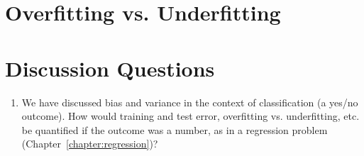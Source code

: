 \section{Overfitting vs. Underfitting}



\section{Discussion Questions}

\begin{enumerate}
\item We have discussed bias and variance in the context of classification (a yes/no outcome). How would training and test error, overfitting vs. underfitting, etc. be quantified if the outcome was a number, as in a regression problem (Chapter~\ref{chapter:regression})?
\end{enumerate}